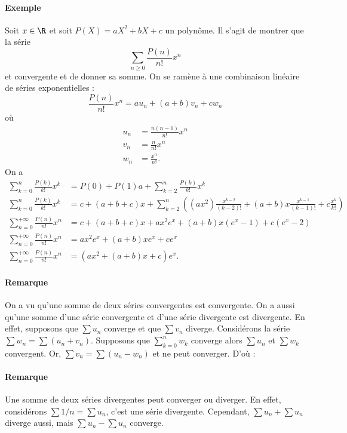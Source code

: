 \documentclass{livre}
\begin{document}
\paragraph{Exemple}Soit $x\in \R$ et soit $P(X) = aX^{2}+ bX + c$ un polynôme. Il s'agit de montrer que la série \[ \sum_{n\geq 0}\frac{P(n)}{n!}x^{n}\]et convergente et de donner sa somme. On se ramène à une combinaison linéaire de séries exponentielles : \[ \frac{P(n)}{n!}x^{n} = au_n + (a+b) v_n + cw_n\]où 
\begin{align*}
u_n &= \frac{n(n-1)}{n!}x^{n} \\
v_n &= \frac{n}{n!}x^{n}\\
w_n &= \frac{x^{n}}{n!}.
\end{align*}
On a 
\begin{align*}
\sum_{k=0}^{n} \frac{P(k)}{k!}x^{k} &= P(0) + P(1) a + \sum_{k=2}^{n}\frac{P(k)}{k!}x^{k}\\
\sum_{k=0}^{n} \frac{P(k)}{k!}x^{k} &=c + (a+b+c)x + \sum_{k=2}^{n}\left( (ax^{2})\frac{x^{k-2}}{(k-2)!} + (a+b)x \frac{x^{k-1}}{(k-1)!} + c\frac{x^{k}}{k!}\right)\\
\sum_{n=0}^{+\infty}\frac{P(n)}{n!}x^{n} &= c + (a+b+c)x + ax^{2}e^{x} + (a+b)x(e^{x}-1) + c(e^{x} -2)\\
\sum_{n=0}^{+\infty}\frac{P(n)}{n!}x^{n} &= ax^{2}e^{x} + (a+b)xe^{x} + ce^{x}\\
\sum_{n=0}^{+\infty}\frac{P(n)}{n!}x^{n} &= (ax^{2}+(a+b)x+c)e^{x}.
\end{align*}

\paragraph{Remarque}On a vu qu'une somme de deux séries convergentes est convergente. On a aussi qu'une somme d'une série convergente et d'une série divergente est divergente. En effet, supposons que $\sum u_n$ converge et que $\sum v_n$ diverge. Considérons la série $\sum w_n = \sum (u_n + v_n).$ Supposons que $\sum_{k=0}^{n}w_k$ converge alors $\sum u_n$ et $\sum w_k$ convergent. Or, $\sum v_n = \sum (u_n - w_n)$ et ne peut converger.
D'où :
\paragraph{Remarque}Une somme de deux séries divergentes peut converger ou diverger. En effet, considérons $\sum 1/n = \sum u_n$, c'est une série divergente. Cependant, $\sum u_n + \sum u_n$ diverge aussi, mais $\sum u_n - \sum u_n$ converge.
\end{document}
